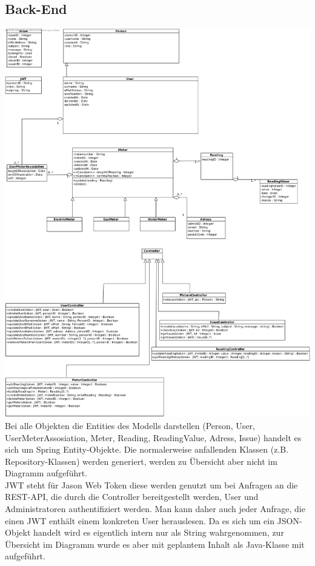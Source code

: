 \subsection{Back-End}
\includegraphics[width=15cm]{img/diagrams/backend-class-diagram}\\
Bei alle Objekten die Entities des Modells darstellen (Person, User, UserMeterAssosiation, Meter, Reading, ReadingValue, Adress, Issue) handelt es sich um Spring Entity-Objekte. Die normalerweise anfallenden Klassen (z.B. Repository-Klassen) werden generiert, werden zu Übersicht aber nicht im Diagramm aufgeführt.\\
JWT steht für Jason Web Token diese werden genutzt um bei Anfragen an die REST-API, die durch die Controller bereitgestellt werden, User und Administratoren authentifiziert werden. Man kann daher auch jeder Anfrage, die einen JWT enthält einem konkreten User herauslesen. Da es sich um ein JSON-Objekt handelt wird es eigentlich intern nur als String wahrgenommen, zur Übersicht im Diagramm wurde es aber mit geplantem Inhalt als Java-Klasse mit aufgeführt.\\
